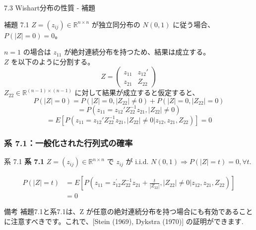 \documentclass[aspectratio=169]{beamer}
\begin{document}
\begin{frame}{7.3 Wishart分布の性質 - 補題}
\begin{block}{補題 7.1}
$Z = (z_{ij}) \in \mathbb{R}^{n \times n}$ が独立同分布の $N(0, 1)$ に従う場合、$P(|Z| = 0) = 0$。
\end{block}

$n=1$ の場合は $z_{11}$ が絶対連続分布を持つため、結果は成立する。\\
$Z$ を以下のように分割する。
\[
Z = \begin{pmatrix} z_{11} & z_{12}' \\ z_{21} & Z_{22} \end{pmatrix}
\]
$Z_{22} \in \mathbb{R}^{(n-1) \times (n-1)}$ に対して結果が成立すると仮定すると、
\[
P(|Z|=0) = P(|Z|=0, |Z_{22}| \ne 0) + P(|Z|=0, |Z_{22}|=0)
\]
\[
= P(z_{11} = z_{12}'Z_{22}^{-1}z_{21}, |Z_{22}| \ne 0)
\]
\[
= E[P(z_{11} = z_{12}'Z_{22}^{-1}z_{21}, |Z_{22}| \ne 0 | z_{12}, z_{21}, Z_{22})] = 0
\]
\end{frame}

\begin{frame}
\frametitle{系 7.1：一般化された行列式の確率}
\begin{block}{系 7.1}
\textbf{系 7.1} $Z=(z_{ij})\in\mathbb{R}^{n\times n}$ で $z_{ij}$ が i.i.d. $N(0,1)\Rightarrow P(|Z|=t)=0, \forall t$.
\end{block}

\begin{align*} 
P(|Z|=t) &= E[P(z_{11}=z_{12}^{\prime}Z_{22}^{-1}z_{21}+\frac{t}{|Z_{22}|},|Z_{22}|\ne0|z_{12},z_{21},Z_{22})] \\ 
&= 0
\end{align*}


\begin{alertblock}{備考}
補題7.1と系7.1は、Z が任意の絶対連続分布を持つ場合にも有効であることに注意すべきです。これで、[Stein (1969), Dykstra (1970)] の証明ができます.
\end{alertblock}
\end{frame}
\end{document}
